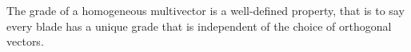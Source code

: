 \begin{lemma}\label{l:grade-definiteness}
	The grade of a homogeneous multivector is a well-defined property, that is to say every blade has a unique grade that is independent of the choice of orthogonal vectors.
\end{lemma}
